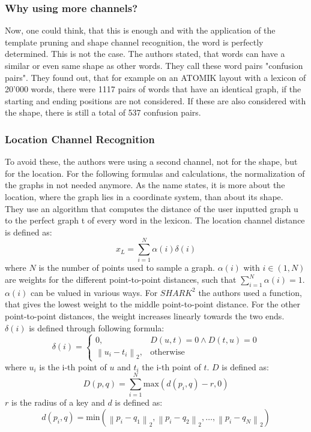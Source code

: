 \subsubsection{Why using more channels?}
Now, one could think, that this is enough and with the application of the template pruning and shape channel recognition, the word is perfectly determined. This is not the case. The authors stated, that words can have a similar or even same shape as other words. They call these word pairs "confusion pairs". They found out, that for example on an ATOMIK layout with a lexicon of 20'000 words, there were 1117 pairs of words that have an identical graph, if the starting and ending positions are not considered. If these are also considered with the shape, there is still a total of 537 confusion pairs.

\subsubsection{Location Channel Recognition}
To avoid these, the authors were using a second channel, not for the shape, but for the location. For the following formulas and calculations, the normalization of the graphs in not needed anymore. As the name states, it is more about the location, where the graph lies in a coordinate system, than about its shape.\\
They use an algorithm that computes the distance of the user inputted graph u to the perfect graph t of every word in the lexicon. The location channel distance is defined as:
\begin{equation}
    x_L = \sum_{i = 1}^{N}\alpha(i)\delta(i)
    \label{eqn:locationformula}
\end{equation}
where $N$ is the number of points used to sample a graph. $\alpha(i)$ with $i \in (1,N)$ are weights for the different point-to-point distances, such that $\sum_{i = 1}^{N}\alpha(i) = 1$. $\alpha(i)$ can be valued in various ways. For $SHARK^2$ the authors used a function, that gives the lowest weight to the middle point-to-point distance. For the other point-to-point distances, the weight increases linearly towards the two ends. $\delta(i)$ is defined through following formula:
\begin{equation}
    \delta(i) =
        \begin{cases}
            0, & D(u,t) = 0 \land D(t,u) = 0 \\
            \left\lVert u_i - t_i \right\rVert_2, & \text{otherwise}
        \end{cases}
\end{equation}
where $u_i$ is the i-th point of $u$ and $t_i$ the i-th point of $t$. $D$ is defined as:
\begin{equation}
    D(p,q) = \sum_{i = 1}^{N}\text{max}(d(p_i,q) - r,0)
\end{equation}
$r$ is the radius of a key and $d$ is defined as:
\begin{equation}
    d(p_i,q) = \text{min}(\left\lVert p_i - q_1 \right\rVert_2, \left\lVert p_i - q_2 \right\rVert_2, \dots, \left\lVert p_i - q_N\right\rVert_2)
\end{equation}


